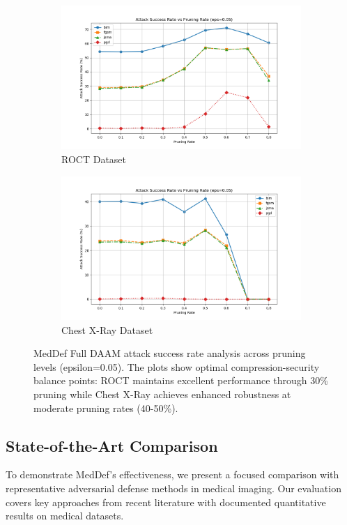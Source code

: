 \documentclass[preprint,12pt]{elsarticle}
\begin{document}
\begin{figure}[!t]
\centering
\begin{subfigure}[b]{0.45\columnwidth}
\centering
\includegraphics[width=\columnwidth]{fig/asr-prunning/roct/roct_0.05_meddef1.png}
\caption{ROCT Dataset}
\label{fig:asr_meddef_005_a}
\end{subfigure}
\hfill
\begin{subfigure}[b]{0.45\columnwidth}
\centering
\includegraphics[width=\columnwidth]{fig/asr-prunning/chest_xray/0.05_meddef1.png}
\caption{Chest X-Ray Dataset}
\label{fig:asr_meddef_005_b}
\end{subfigure}
\caption{MedDef Full DAAM attack success rate analysis across pruning levels (epsilon=0.05). The plots show optimal compression-security balance points: ROCT maintains excellent performance through 30\% pruning while Chest X-Ray achieves enhanced robustness at moderate pruning rates (40-50\%).}
\label{fig:asr_meddef_005}
\end{figure}

\subsection{State-of-the-Art Comparison}
To demonstrate MedDef's effectiveness, we present a focused comparison with representative adversarial defense methods in medical imaging. Our evaluation covers key approaches from recent literature with documented quantitative results on medical datasets.
\end{document}
